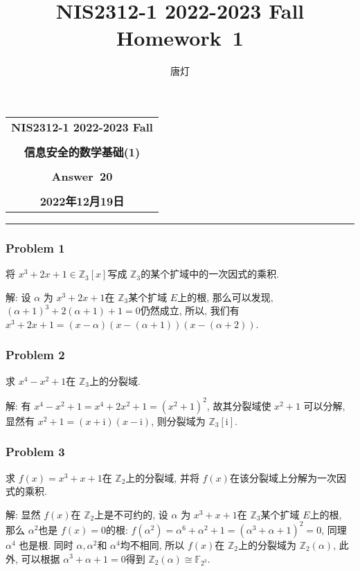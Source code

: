 \documentclass[a4paper,12pt]{ctexart}
\title{NIS2312-1 2022-2023 Fall Homework~1}
\author{唐灯}
\newcommand{\Z}{\mathbb{Z}}
\newcommand{\F}{\mathbb{F}}
\begin{document}
  \begin{center}

  \vspace{-0.3in}
  \begin{tabular}{c}
    \textbf{\Large NIS2312-1 2022-2023 Fall} \\
    \textbf{\Large  } \\
    \textbf{\Large  信息安全的数学基础(1)} \\
    \textbf{\Large  } \\
    \textbf{\Large  Answer~20} \\
    \textbf{\Large  } \\
    \textbf{\Large 2022年12月19日} \\
  \end{tabular}
  \end{center}
  \noindent
  \rule{\linewidth}{0.4pt}
  

\subsubsection*{Problem 1}
    将 $ x^3+2x+1\in\Z_3[x] $写成 $ \Z_3 $的某个扩域中的一次因式的乘积.

    解: 设 $ \alpha $ 为 $ x^3+2x+1 $在 $ \Z_3 $某个扩域 $ E $上的根, 那么可以发现, $ (\alpha+1)^3+2(\alpha+1)+1=0 $仍然成立, 所以, 我们有 $ x^3+2x+1=(x-\alpha)(x-(\alpha+1))(x-(\alpha+2)) $.
\subsubsection*{Problem 2}
    求 $ x^4-x^2+1 $在 $ \Z_3 $上的分裂域.

    解: 有 $ x^4-x^2+1=x^4+2x^2+1=(x^2+1)^2 $, 故其分裂域使 $ x^2+1 $ 可以分解, 显然有 $ x^2+1=(x+\mathrm{i})(x-\mathrm{i}) $, 则分裂域为 $ \Z_3[\mathrm{i}] $.

\subsubsection*{Problem 3}
    求 $ f(x)=x^3+x+1 $在 $ \Z_2 $上的分裂域, 并将 $ f(x) $在该分裂域上分解为一次因式的乘积. 
    
    解: 显然 $ f(x) $在 $ \Z_2 $上是不可约的, 设 $ \alpha $ 为 $ x^3+x+1 $在 $ \Z_3 $某个扩域 $ E $上的根, 那么 $ \alpha^2 $也是 $ f(x)=0 $的根: $ f(\alpha^2)=\alpha^6+\alpha^2+1=(\alpha^3+\alpha+1)^2=0 $, 同理 $ \alpha^4 $ 也是根. 同时 $ \alpha,\alpha^2 $和 $ \alpha^4 $均不相同, 所以 $ f(x) $在 $ \Z_2 $上的分裂域为 $ \Z_2(\alpha) $, 此外, 可以根据 $ \alpha^3+\alpha+1=0 $得到 $ \Z_2(\alpha)\cong\F_{2^3} $.


    
\end{document}
